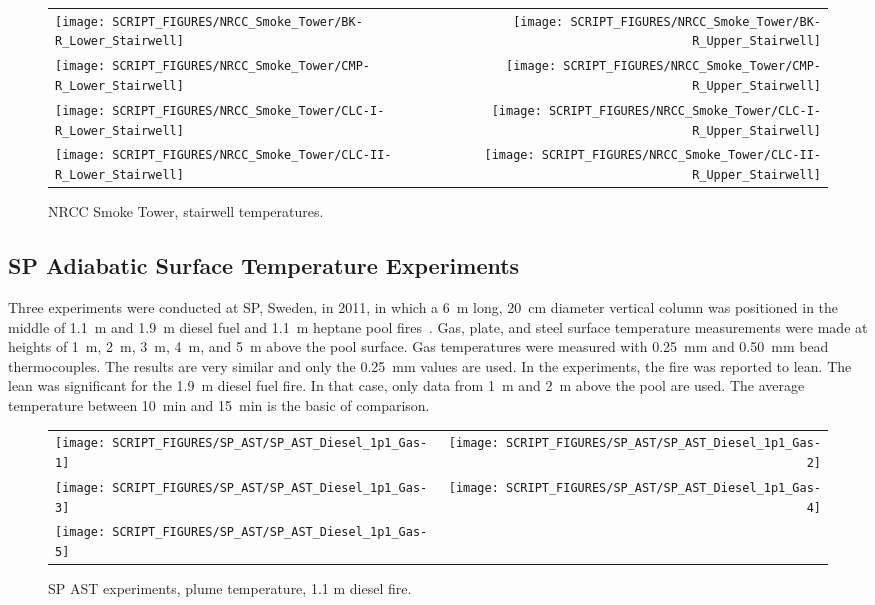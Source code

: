 \newpage

\begin{figure}[p]
\begin{tabular*}{\textwidth}{l@{\extracolsep{\fill}}r}
\texttt{[image: SCRIPT\_FIGURES/NRCC\_Smoke\_Tower/BK-R\_Lower\_Stairwell]} &
\texttt{[image: SCRIPT\_FIGURES/NRCC\_Smoke\_Tower/BK-R\_Upper\_Stairwell]} \\
\texttt{[image: SCRIPT\_FIGURES/NRCC\_Smoke\_Tower/CMP-R\_Lower\_Stairwell]} &
\texttt{[image: SCRIPT\_FIGURES/NRCC\_Smoke\_Tower/CMP-R\_Upper\_Stairwell]} \\
\texttt{[image: SCRIPT\_FIGURES/NRCC\_Smoke\_Tower/CLC-I-R\_Lower\_Stairwell]} &
\texttt{[image: SCRIPT\_FIGURES/NRCC\_Smoke\_Tower/CLC-I-R\_Upper\_Stairwell]} \\
\texttt{[image: SCRIPT\_FIGURES/NRCC\_Smoke\_Tower/CLC-II-R\_Lower\_Stairwell]} &
\texttt{[image: SCRIPT\_FIGURES/NRCC\_Smoke\_Tower/CLC-II-R\_Upper\_Stairwell]}
\end{tabular*}
\caption[NRCC Smoke Tower, stairwell temperatures]{NRCC Smoke Tower, stairwell temperatures.}
\label{NRCC_Smoke_Tower_Stairwell}
\end{figure}



\clearpage


\subsection{SP Adiabatic Surface Temperature Experiments}

Three experiments were conducted at SP, Sweden, in 2011, in which a 6~m long, 20~cm diameter vertical column was positioned in the middle of 1.1~m and 1.9~m diesel fuel and 1.1~m heptane
pool fires~\cite{Sjostrom:AST}. Gas, plate, and steel surface temperature measurements were made at heights of 1~m, 2~m, 3~m, 4~m, and 5~m above the pool surface. Gas temperatures were measured with 0.25~mm and 0.50~mm bead thermocouples. The results are very similar and only the 0.25~mm values are used. In the experiments, the fire was reported to lean. The lean was significant for the 1.9~m diesel fuel fire. In that case, only data from 1~m and 2~m above the pool are used. The average temperature between 10~min and 15~min is the basic of comparison.


\begin{figure}[!h]
\begin{tabular*}{\textwidth}{l@{\extracolsep{\fill}}r}
\texttt{[image: SCRIPT\_FIGURES/SP\_AST/SP\_AST\_Diesel\_1p1\_Gas-1]}   &  \texttt{[image: SCRIPT\_FIGURES/SP\_AST/SP\_AST\_Diesel\_1p1\_Gas-2]}    \\
\texttt{[image: SCRIPT\_FIGURES/SP\_AST/SP\_AST\_Diesel\_1p1\_Gas-3]}   &  \texttt{[image: SCRIPT\_FIGURES/SP\_AST/SP\_AST\_Diesel\_1p1\_Gas-4]}     \\
\texttt{[image: SCRIPT\_FIGURES/SP\_AST/SP\_AST\_Diesel\_1p1\_Gas-5]}   &
\end{tabular*}
\caption[SP AST experiments, plume temperature, 1.1 m diesel fire]
{SP AST experiments, plume temperature, 1.1 m diesel fire.}
\label{SP_Diesel_1p1_Gas}
\end{figure}

